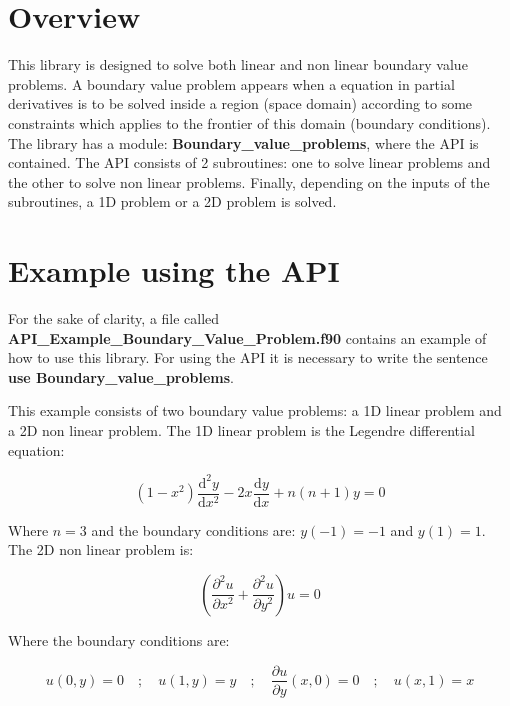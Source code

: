 \section{Overview}

This library is designed to solve both linear and non linear boundary value problems. 
A boundary value problem appears when a equation  in partial derivatives is to be solved inside a region (space domain) according to some constraints which applies to the frontier of this domain (boundary conditions).
The library has a module:  \textbf{Boundary\_value\_problems}, where the API is contained. 
The API consists of 2 subroutines: one to solve linear problems and the other to solve non linear problems. Finally, depending on the inputs of the subroutines, a 1D problem or a  2D problem is solved.

\section{Example using the API}

For the sake of clarity, a file called \textbf{API\_Example\_Boundary\_Value\_Problem.f90} contains an example of how to use this library. For using the API it is necessary to write the sentence \textbf{use Boundary\_value\_problems}. 

This example consists of two boundary value problems: a 1D linear problem and a 2D non linear problem. The 1D linear problem is the Legendre differential equation:

\begin{equation*}      	
(1 - x^2) \frac{\text{d}^2 y}{\text{d} x^2} - 2x \frac{\text{d} y}{\text{d} x} + n (n + 1) y = 0
\end{equation*}

Where $n = 3$ and the boundary conditions are: $y(-1) = - 1$ and $y(1) = 1$. The 2D non linear problem is:

\begin{equation*}      	
\left( \frac{\partial^2 u}{\partial x^2} +  \frac{\partial^2 u}{\partial y^2} \right) u = 0
\end{equation*}

Where the boundary conditions are:

\begin{equation*}      	
u(0,y) = 0 \quad ; \quad 
u(1,y) = y  \quad ; \quad 
\frac{\partial u}{\partial y}(x,0) = 0 \quad ; \quad 
u(x,1) = x  
\end{equation*}


\newpage

